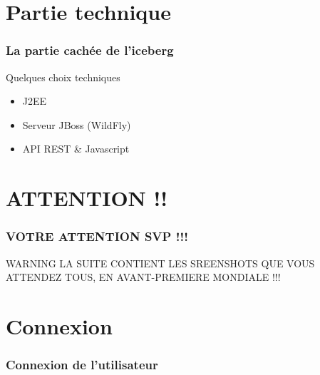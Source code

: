 \documentclass{beamer}
\begin{document}
	\section{Partie technique}
		\begin{frame}
			\frametitle{La partie cachée de l'iceberg}
			\begin{block}{Quelques choix techniques}
				\begin{itemize}
					\item J2EE
					\item Serveur JBoss (WildFly)
					\item API REST \& Javascript
				\end{itemize}
			\end{block}
		\end{frame}
	
	\section{ATTENTION !!}
		\begin{frame}
			\frametitle{VOTRE ATTENTION SVP !!!}
			\begin{alertblock}{WARNING}
				LA SUITE CONTIENT LES SREENSHOTS QUE VOUS ATTENDEZ TOUS, EN AVANT-PREMIERE MONDIALE !!!
			\end{alertblock}
		\end{frame}
		
	\section{Connexion}
		\begin{frame}
		\frametitle{Connexion de l'utilisateur}
		\end{frame}
		
\end{document}
